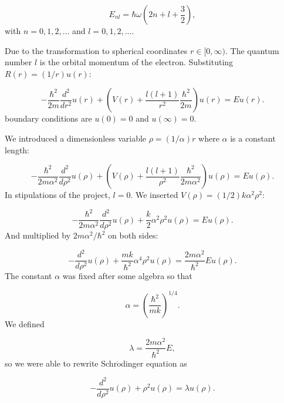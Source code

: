 \documentclass[%
reprint,
superscriptaddress,
showpacs,
nofootinbib,
bibnotes,amsmath,amssymb,aps,
prc, 
]{revtex4-1}
\begin{document}
	\begin{equation*}
		E_{nl}=  \hbar \omega \left(2n+l+\frac{3}{2}\right),
	\end{equation*}
	with $n=0,1,2,\dots$ and $l=0,1,2,\dots$.
	
	Due to the transformation to spherical coordinates
	$r\in [0,\infty)$.  
	The quantum number
	$l$ is the orbital momentum of the electron.  
	Substituting $R(r) = (1/r) u(r)$:
	
	\begin{equation*}
		-\frac{\hbar^2}{2 m} \frac{d^2}{dr^2} u(r) 
		+ \left ( V(r) + \frac{l (l + 1)}{r^2}\frac{\hbar^2}{2 m}
		\right ) u(r)  = E u(r) .
	\end{equation*}
	boundary conditions are $u(0)=0$ and $u(\infty)=0$.
	
	We introduced a dimensionless variable $\rho = (1/\alpha) r$
	where $\alpha$ is a constant length:
	
	\begin{equation*}
		-\frac{\hbar^2}{2 m \alpha^2} \frac{d^2}{d\rho^2} u(\rho) 
		+ \left ( V(\rho) + \frac{l (l + 1)}{\rho^2}
		\frac{\hbar^2}{2 m\alpha^2} \right ) u(\rho)  = E u(\rho) .
	\end{equation*}
	In stipulations of the project, $l=0$.
	We inserted $V(\rho) = (1/2) k \alpha^2\rho^2$:
	
	\begin{equation*}
		-\frac{\hbar^2}{2 m \alpha^2} \frac{d^2}{d\rho^2} u(\rho) 
		+ \frac{k}{2} \alpha^2\rho^2u(\rho)  = E u(\rho) .
	\end{equation*}
	And multiplied by $2m\alpha^2/\hbar^2$ on both sides:
	
	\begin{equation*}
		-\frac{d^2}{d\rho^2} u(\rho) 
		+ \frac{mk}{\hbar^2} \alpha^4\rho^2u(\rho)  = \frac{2m\alpha^2}{\hbar^2}E u(\rho) .
	\end{equation*}
	The constant $\alpha$ was fixed after some algebra
	so that
	
	
	\begin{equation*}
		\alpha = \left(\frac{\hbar^2}{mk}\right)^{1/4}.
	\end{equation*}
	We defined
	
	\begin{equation*}
		\lambda = \frac{2m\alpha^2}{\hbar^2}E,
	\end{equation*}
	so we were able to rewrite Schr$\ddot{\textrm{o}}$dinger equation as
	
	\begin{equation*}
		-\frac{d^2}{d\rho^2} u(\rho) + \rho^2u(\rho)  = \lambda u(\rho) .
	\end{equation*}
	
\end{document}
